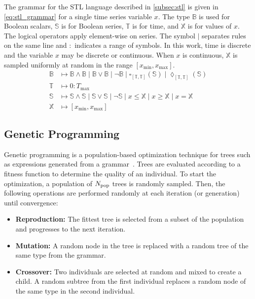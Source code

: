 The grammar for the STL language described in \cref{subsec:stl} is given in \cref{eq:stl_grammar} for a single time series variable $x$. The type $\mathbb{B}$ is used for Boolean scalars, $\mathbb{S}$ is for Boolean series, $\mathbb{T}$ is for time, and $\mathbb{X}$ is for values of $x$. The logical operators apply element-wise on series. The symbol $\mid$ separates rules on the same line and $:$ indicates a range of symbols. In this work, time is discrete and the variable $x$ may be discrete or continuous. When $x$ is continuous, $\mathbb{X}$ is sampled uniformly at random in the range $[x_{\min}, x_{\max}]$.
\begin{equation}
\label{eq:stl_grammar}
\begin{split}
    \mathbb{B} &\mapsto \mathbb{B} \land \mathbb{B} \mid \mathbb{B} \lor \mathbb{B} \mid \neg \mathbb{B} \mid \square_{[\mathbb{T},\mathbb{T}]}(\mathbb{S}) \mid \lozenge_{[\mathbb{T},\mathbb{T}]}(\mathbb{S}) \\
    \mathbb{T} &\mapsto 0:T_{\max} \\
    \mathbb{S} &\mapsto \mathbb{S} \land \mathbb{S} \mid \mathbb{S} \lor \mathbb{S} \mid \neg \mathbb{S} \mid x \leq \mathbb{X} \mid x \geq \mathbb{X} \mid x = \mathbb{X} \\
    \mathbb{X} &\mapsto [x_{\min},x_{\max}]
\end{split}
\end{equation}


\subsection{Genetic Programming}
\label{subsec:gp}
Genetic programming is a population-based optimization technique for trees such as expressions generated from a grammar~\cite{kochenderfer2019algorithms, koza1992genetic}. Trees are evaluated according to a fitness function to determine the quality of an individual. To start the optimization, a population of $N_{\rm pop}$ trees is randomly sampled. Then, the following operations are performed randomly at each iteration (or generation) until convergence:
\begin{itemize}
    \item \textbf{Reproduction:} The fittest tree is selected from a subset of the population and progresses to the next iteration.
    \item \textbf{Mutation:} A random node in the tree is replaced with a random tree of the same type from the grammar.
    \item \textbf{Crossover:} Two individuals are selected at random and mixed to create a child. A random subtree from the first individual replaces a random node of the same type in the second individual.
\end{itemize}

